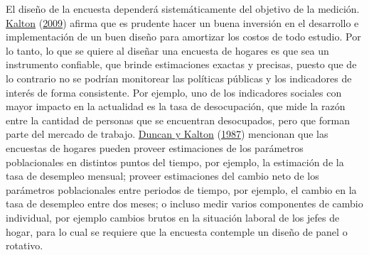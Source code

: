 \documentclass[
  12pt,
  spanish,
]{book}
\begin{document}
El diseño de la encuesta dependerá sistemáticamente del objetivo de la medición. \protect\hyperlink{ref-Kalton_2009}{Kalton} (\protect\hyperlink{ref-Kalton_2009}{2009}) afirma que es prudente hacer un buena inversión en el desarrollo e implementación de un buen diseño para amortizar los costos de todo estudio. Por lo tanto, lo que se quiere al diseñar una encuesta de hogares es que sea un instrumento confiable, que brinde estimaciones exactas y precisas, puesto que de lo contrario no se podrían monitorear las políticas públicas y los indicadores de interés de forma consistente. Por ejemplo, uno de los indicadores sociales con mayor impacto en la actualidad es la tasa de desocupación, que mide la razón entre la cantidad de personas que se encuentran desocupados, pero que forman parte del mercado de trabajo. \protect\hyperlink{ref-Duncan_Kalton_1987}{Duncan y Kalton} (\protect\hyperlink{ref-Duncan_Kalton_1987}{1987}) mencionan que las encuestas de hogares pueden proveer estimaciones de los parámetros poblacionales en distintos puntos del tiempo, por ejemplo, la estimación de la tasa de desempleo mensual; proveer estimaciones del cambio neto de los parámetros poblacionales entre periodos de tiempo, por ejemplo, el cambio en la tasa de desempleo entre dos meses; o incluso medir varios componentes de cambio individual, por ejemplo cambios brutos en la situación laboral de los jefes de hogar, para lo cual se requiere que la encuesta contemple un diseño de panel o rotativo.
\end{document}
